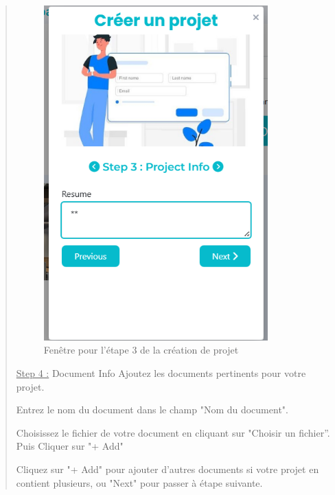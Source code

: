 \documentclass[a4paper,12pt]{article}
\begin{document}
\begin{quote}
\begin{figure}[H]
\centering
\includegraphics[width=0.85\textwidth]{IMAGES/etape3-projet.png}
\caption{Fenêtre pour l'étape 3 de la création de projet}
\label{fig:etape3projet}
\end{figure}

\underline{Step 4 :} Document Info Ajoutez les documents pertinents pour votre projet.

Entrez le nom du document dans le champ "Nom du document".

Choisissez le fichier de votre document en cliquant sur "Choisir un fichier”. Puis Cliquer sur "+ Add"

Cliquez sur "+ Add" pour ajouter d'autres documents si votre projet en contient plusieurs, ou "Next" pour passer à étape suivante.



\end{quote}
\end{document}
